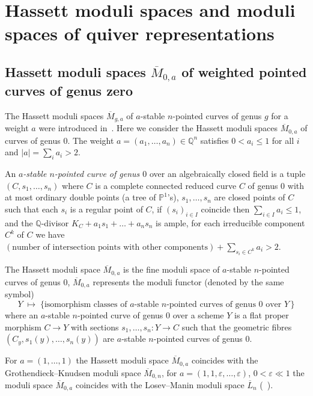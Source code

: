 \documentclass[ALCO,ThmDefs,Unicode,epreuves]{cedram}
\def\Q{\mathds Q}
\def\P{\mathds P}
\begin{document}
\section{Hassett moduli spaces and moduli spaces of quiver representations}
\label{sec:M0a}

\subsection{Hassett moduli spaces \texorpdfstring{$\overline{M}_{0,a}$}{M0,a} of weighted pointed curves of genus zero}

The Hassett moduli spaces $\overline{M}_{g,a}$ of $a$-stable $n$-pointed curves
of genus $g$ for a weight $a$ were introduced in~\cite{Ha03}. Here we consider 
the Hassett moduli spaces $\overline{M}_{0,a}$ of curves of genus $0$. The weight
$a=(a_1,\ldots,a_n)\in\Q^n$ satisfies $0<a_i\leq 1$ for all $i$ and $|a|=\sum_ia_i>2$.

\begin{defi}
An {\it $a$-stable $n$-pointed curve of genus $0$} over an algebraically closed 
field is a tuple $(C,s_1,\ldots,s_n)$ where $C$ is a complete 
connected reduced curve $C$ of genus $0$ with at most ordinary double 
points (\ie a tree of $\P^1$'s), $s_1,\ldots,s_n$ are closed points of $C$ 
such that each $s_i$ is a regular point of $C$, if $(s_i)_{i\in I}$ coincide
then $\sum_{i\in I}a_i\leq 1$, and the $\Q$-divisor $K_C+a_1s_1+\ldots+a_ns_n$ 
is ample, \ie for each irreducible component $C^k$ of $C$ we have 
$(\text{number of intersection points with other components})+
\sum_{s_i\in C^k}a_i>2$.
\end{defi}


\begin{defithm}[\cite{Ha03}]
The Hassett moduli space $\overline{M}_{0,a}$ is 
the fine moduli space of $a$-stable $n$-pointed curves of genus $0$, 
\ie $\overline{M}_{0,a}$ represents the moduli functor (denoted by the same symbol)
\[ 
Y\;\mapsto\;\Big\{\text{isomorphism classes of $a$-stable $n$-pointed curves 
of genus $0$ over $Y\,$}\Big\}
\]
where an $a$-stable $n$-pointed curve of genus $0$ over a scheme $Y$ is a 
flat proper morphism $C\!\to\!Y$ with sections 
$s_1,\ldots,s_n\colon Y\!\to C$ such that the geometric fibres 
$(C_y,s_1(y),\ldots,s_n(y))$ are $a$-stable $n$-pointed curves of genus $0$. 
\end{defithm}

For $a=(1,\ldots,1)$ the Hassett moduli space $\overline{M}_{0,a}$
coincides with the Grothendieck--Knudsen moduli space $\overline{M}_{0,n}$,
for $a=(1,1,\varepsilon,\ldots,\varepsilon)$, $0<\varepsilon\ll 1$ the moduli space
$\overline{M}_{0,a}$ coincides with the Losev--Manin moduli space $\overline{L}_{n}$
(\cf~\cite[6.4 and~7.1]{Ha03}).
\end{document}
